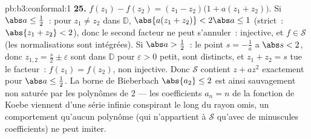 \begin{solution}{pb:b3:conformal:1}
\textbf{25.} $f(z_1) - f(z_2) = (z_1 - z_2)\bigl(1 + a(z_1 +
z_2)\bigr)$. Si $\abs a \leq \frac12$~: pour $z_1 \neq z_2$
dans $\mathbb D$, $\abs{a(z_1 + z_2)} < 2\abs a \leq 1$
(strict~: $\abs{z_1 + z_2} < 2$), donc le second facteur ne
peut s'annuler~: injective, et $f \in \mathcal S$ (les
normalisations sont intégrées). Si $\abs a > \frac12$~: le
point $s = -\frac1a$ a $\abs s < 2$, donc $z_{1,2} =
\frac s2 \pm \varepsilon$ sont dans $\mathbb D$ pour
$\varepsilon > 0$ petit, sont distincts, et $z_1 + z_2 = s$
tue le facteur~: $f(z_1) = f(z_2)$, non injective. Donc
$\mathcal S$ contient $z + az^2$ exactement pour $\abs a
\leq \frac12$. La borne de Bieberbach $\abs{a_2} \leq 2$
est ainsi sauvagement non saturée par les polynômes de
 $2$ --- les coefficients $a_n = n$ de la fonction de
Koebe viennent d'une série infinie conspirant le long du
rayon omis, un comportement qu'aucun polynôme (qui
n'appartient à $\mathcal S$ qu'avec de minuscules
coefficients) ne peut imiter.
\end{solution}
